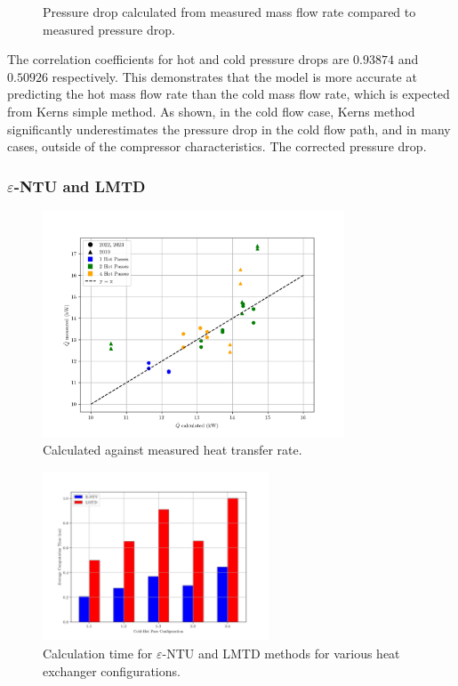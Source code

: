 \documentclass{article}
\begin{document}
\begin{figure}[H]
  \caption{Pressure drop calculated from measured mass flow rate compared to measured pressure drop.}
  \label{fig:pressure_drops}

\end{figure}

The correlation coefficients for hot and cold pressure drops are $\mathbf{0.93874}$ and $\mathbf{0.50926}$ respectively.
This demonstrates that the model is more accurate at predicting the hot mass flow rate than the cold mass flow rate,
which is expected from Kerns simple method.
As shown, in the cold flow case, Kerns method significantly underestimates the pressure drop in the cold flow path, and in many cases, outside of the compressor characteristics.
The corrected pressure drop.

\subsubsection{$\varepsilon$-NTU and LMTD}


\begin{figure}[H]
  \centering
  \includegraphics[width=0.8\textwidth]{Qdot_ccalc_vs_measured.png}
  \caption{Calculated against measured heat transfer rate.}
\end{figure}

\begin{figure}[H]
  \centering
  \includegraphics[width=0.6\textwidth]{entu_lmtd_speed.png}
  \caption{Calculation time for $\varepsilon$-NTU and LMTD methods for various heat exchanger configurations.}
  \label{fig:entu_lmtd_speed}
\end{figure}
\end{document}
